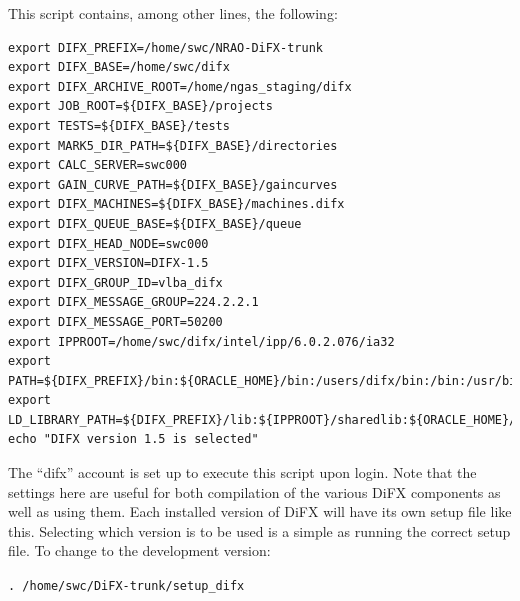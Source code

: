This script contains, among other lines, the following:

\begin{verbatim}
export DIFX_PREFIX=/home/swc/NRAO-DiFX-trunk
export DIFX_BASE=/home/swc/difx
export DIFX_ARCHIVE_ROOT=/home/ngas_staging/difx
export JOB_ROOT=${DIFX_BASE}/projects
export TESTS=${DIFX_BASE}/tests
export MARK5_DIR_PATH=${DIFX_BASE}/directories
export CALC_SERVER=swc000
export GAIN_CURVE_PATH=${DIFX_BASE}/gaincurves
export DIFX_MACHINES=${DIFX_BASE}/machines.difx
export DIFX_QUEUE_BASE=${DIFX_BASE}/queue
export DIFX_HEAD_NODE=swc000
export DIFX_VERSION=DIFX-1.5
export DIFX_GROUP_ID=vlba_difx
export DIFX_MESSAGE_GROUP=224.2.2.1
export DIFX_MESSAGE_PORT=50200
export IPPROOT=/home/swc/difx/intel/ipp/6.0.2.076/ia32
export PATH=${DIFX_PREFIX}/bin:${ORACLE_HOME}/bin:/users/difx/bin:/bin:/usr/bin
export LD_LIBRARY_PATH=${DIFX_PREFIX}/lib:${IPPROOT}/sharedlib:${ORACLE_HOME}/lib
echo "DIFX version 1.5 is selected"
\end{verbatim}

The ``difx'' account is set up to execute this script upon login.
Note that the settings here are useful for both compilation of the various DiFX components as well as using them.
Each installed version of DiFX will have its own setup file like this.
Selecting which version is to be used is a simple as running the correct setup file.
To change to the development version:

{\tt . /home/swc/DiFX-trunk/setup\_difx}

